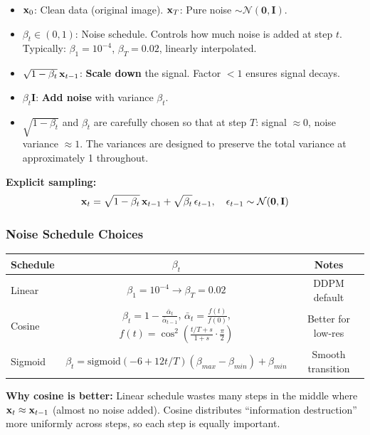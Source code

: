 \begin{keybox}
\begin{itemize}
\item $\mathbf{x}_0$: Clean data (original image). $\mathbf{x}_T$: Pure noise $\sim \mathcal{N}(\mathbf{0}, \mathbf{I})$.
\item $\beta_t \in (0,1)$: Noise schedule. Controls how much noise is added at step $t$. Typically: $\beta_1 = 10^{-4}$, $\beta_T = 0.02$, linearly interpolated.
\item $\sqrt{1-\beta_t}\,\mathbf{x}_{t-1}$: \textbf{Scale down} the signal. Factor $<1$ ensures signal decays.
\item $\beta_t\mathbf{I}$: \textbf{Add noise} with variance $\beta_t$.
\item $\sqrt{1-\beta_t}$ and $\beta_t$ are carefully chosen so that at step $T$: signal $\approx 0$, noise variance $\approx 1$. The variances are designed to preserve the total variance at approximately 1 throughout.
\end{itemize}
\end{keybox}

\textbf{Explicit sampling:}
$$\mathbf{x}_t = \sqrt{1-\beta_t}\,\mathbf{x}_{t-1} + \sqrt{\beta_t}\,\epsilon_{t-1}, \quad \epsilon_{t-1} \sim \mathcal{N}(\mathbf{0},\mathbf{I})$$

\subsubsection{Noise Schedule Choices}
\begin{center}\small
\begin{tabular}{lcc}\toprule
\textbf{Schedule} & \textbf{$\beta_t$} & \textbf{Notes} \\\midrule
Linear & $\beta_1 = 10^{-4} \to \beta_T = 0.02$ & DDPM default \\
Cosine & $\beta_t = 1 - \frac{\bar{\alpha}_t}{\bar{\alpha}_{t-1}}$, $\bar\alpha_t = \frac{f(t)}{f(0)}$, $f(t) = \cos^2(\frac{t/T+s}{1+s}\cdot\frac{\pi}{2})$ & Better for low-res \\
Sigmoid & $\beta_t = \text{sigmoid}(-6+12t/T)(\beta_{max}-\beta_{min}) + \beta_{min}$ & Smooth transition \\
\bottomrule
\end{tabular}
\end{center}

\textbf{Why cosine is better:} Linear schedule wastes many steps in the middle where $\mathbf{x}_t \approx \mathbf{x}_{t-1}$ (almost no noise added). Cosine distributes ``information destruction'' more uniformly across steps, so each step is equally important.

